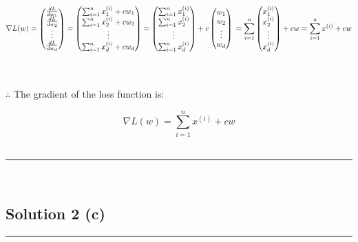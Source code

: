 \documentclass{article}
\begin{document}
$$\nabla L(w) = \begin{pmatrix} 
\frac{dL}{dw_1} \\
\frac{dL}{dw_2} \\
\vdots \\
\frac{dL}{dw_d}
\end{pmatrix} = \begin{pmatrix} 
\sum_{i=1}^{n} x_1^{(i)} + cw_1 \\
\sum_{i=1}^{n} x_2^{(i)} + cw_2 \\
\vdots \\
\sum_{i=1}^{n} x_d^{(i)} + cw_d
\end{pmatrix} = \begin{pmatrix} 
\sum_{i=1}^{n} x_1^{(i)} \\
\sum_{i=1}^{n} x_2^{(i)} \\
\vdots \\
\sum_{i=1}^{n} x_d^{(i)}
\end{pmatrix} + c\begin{pmatrix} 
w_1 \\
w_2 \\
\vdots \\
w_d
\end{pmatrix} \\
= \sum_{i=1}^{n} \begin{pmatrix} 
x_1^{(i)} \\
x_2^{(i)} \\
\vdots \\
x_d^{(i)}
\end{pmatrix} + cw \\
= \sum_{i=1}^{n} x^{(i)} + cw$$\\


\subsubsection*{\normalfont}{$\therefore$ The gradient of the loss function is:}

$$\nabla L(w) = \sum_{i=1}^{n} x^{(i)} + cw$$\\

\noindent\rule{\textwidth}{0.4pt}\\

\newpage

\subsection*{Solution 2 (c)}
\noindent\rule{\textwidth}{0.4pt}\\
\end{document}

